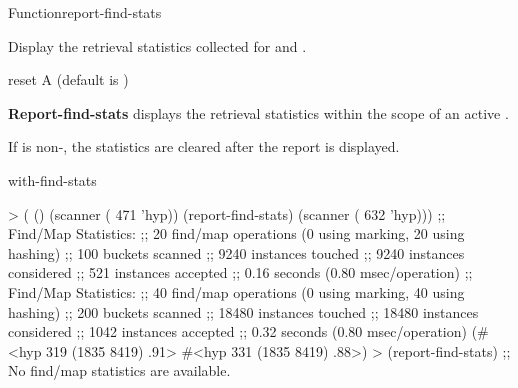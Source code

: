 \documentclass[10pt,twoside,english,pdftex]{article}
\begin{document}
\begin{functiondoc}{Function}{report-find-stats}{ }
%
%
%
  
\fnsyntax

\fnpurpose 
{}%
%
Display the retrieval statistics collected for
\textbf{} and
\textbf{}.

\fnpackage {}

\fnmodule {}

\fnargs
\begin{args}{reset}
\arg[reset] A  (default is \nil)
\end{args}

\fndescription 
{}%
\textbf{Report-find-stats} displays the retrieval statistics within
the scope of an active \textbf{}.

If  is non-\nil, the statistics are cleared after the
report is displayed.

\begin{alsos}{with-find-stats}
\end{alsos}

%
%
\fnexamples
\begin{example}
> ( ()
    (scanner ( 471 'hyp))
    (report-find-stats)
    (scanner ( 632 'hyp)))
;; Find/Map Statistics:
;;        20 find/map operations (0 using marking, 20 using hashing)
;;       100 buckets scanned
;;      9240 instances touched
;;      9240 instances considered
;;       521 instances accepted
;;      0.16 seconds (0.80 msec/operation)
;; Find/Map Statistics:
;;        40 find/map operations (0 using marking, 40 using hashing)
;;       200 buckets scanned
;;     18480 instances touched
;;     18480 instances considered
;;      1042 instances accepted
;;      0.32 seconds (0.80 msec/operation)
(#<hyp 319 (1835 8419) .91>
 #<hyp 331 (1835 8419) .88>)
> (report-find-stats)
;; No find/map statistics are available.
\end{example}

\end{functiondoc}
\end{document}
